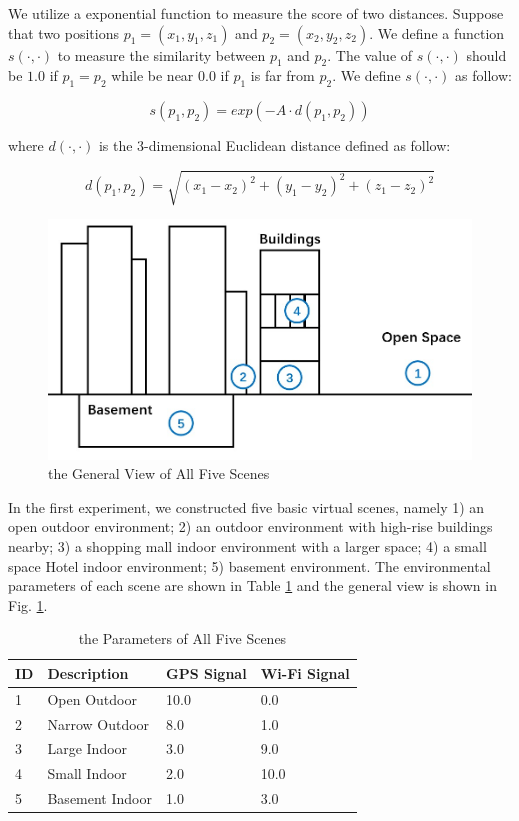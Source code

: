 \documentclass[conference]{IEEEtran}
\begin{document}
We utilize a exponential function to measure the score of two distances. Suppose that two positions $p_1=(x_1,y_1,z_1)$ and $p_2=(x_2,y_2,z_2)$. We define a function $s(\cdot,\cdot)$ to measure the similarity between $p_1$ and $p_2$. The value of $s(\cdot,\cdot)$ should be $1.0$ if $p_1=p_2$ while be near $0.0$ if $p_1$ is far from $p_2$. We define $s(\cdot,\cdot)$ as follow:

\begin{equation}
	s(p_1,p_2)=exp\left( - A \cdot d(p_1,p_2) \right)
\end{equation}

where $d(\cdot,\cdot)$ is the 3-dimensional Euclidean distance defined as follow:

\begin{equation*}
d(p_1,p_2)=\sqrt{(x_1-x_2)^2+(y_1-y_2)^2+(z_1-z_2)^2}
\end{equation*}

\begin{figure}[h]
	\centering
	\includegraphics[scale=0.3]{./figures/scenes.jpg}
	\caption{the General View of All Five Scenes}
	\label{fig:scenes}
\end{figure}

In the first experiment, we constructed five basic virtual scenes, namely 1) an open outdoor environment; 2) an outdoor environment with high-rise buildings nearby; 3) a shopping mall indoor environment with a larger space; 4) a small space Hotel indoor environment; 5) basement environment. The environmental parameters of each scene are shown in Table \ref{tab:scenes} and the general view is shown in Fig. \ref{fig:scenes}.

\begin{table}[h]
	\centering
	\caption{the Parameters of All Five Scenes}
	\label{tab:scenes}
	\begin{tabular}{llll}
		\hline
		ID & Description     & GPS Signal & Wi-Fi Signal \\ \hline
		1  & Open Outdoor    & 10.0       & 0.0          \\
		2  & Narrow Outdoor  & 8.0        & 1.0          \\
		3  & Large Indoor    & 3.0        & 9.0          \\
		4  & Small Indoor    & 2.0        & 10.0         \\
		5  & Basement Indoor & 1.0        & 3.0          \\ \hline             
	\end{tabular}
\end{table}
\end{document}
